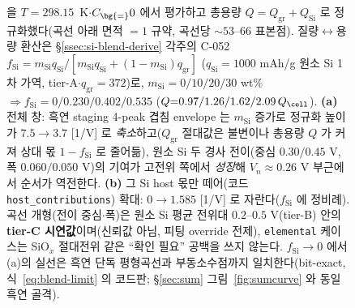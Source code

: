 \begin{figure}[t]
{을 $T{=}298.15$~K$\cdot$$C_\bg{=}0$ 에서 평가하고 총용량 $Q{=}Q_\mathrm{gr}{+}Q_\mathrm{Si}$ 로
정규화했다(곡선 아래 면적 $=1$ 규약, 곡선당 $\sim$$53$--$66$ 표본점). 질량$\leftrightarrow$용량 환산은
§\ref{ssec:si-blend-derive} 각주의 C-052
$f_\mathrm{Si}=m_\mathrm{Si}q_\mathrm{Si}/[m_\mathrm{Si}q_\mathrm{Si}+(1{-}m_\mathrm{Si})q_\mathrm{gr}]$
($q_\mathrm{Si}{=}1000$ mAh/g 원소 Si 1차 가역\cite{limthongkul2003}, tier-A$\cdot$$q_\mathrm{gr}{=}372$)로,
$m_\mathrm{Si}{=}0/10/20/30$ wt\% $\Rightarrow f_\mathrm{Si}{=}0/0.230/0.402/0.535$
($Q{=}0.97/1.26/1.62/2.09\,Q_\cell$). \textbf{(a)} 전체 창: 흑연 staging 4-peak 겹침 envelope 는
$m_\mathrm{Si}$ 증가로 정규화 높이가 $7.5\!\to\!3.7$ [1/V] 로 \emph{축소}하고($Q_\mathrm{gr}$ 절대값은
불변이나 총용량 $Q$ 가 커져 상대 몫 $1{-}f_\mathrm{Si}$ 로 줄어듦), 원소 Si 두 경사 전이(중심 $0.30/0.45$
V, 폭 $0.060/0.050$ V)의 기여가 고전위 쪽에서 \emph{성장}해 $V_n\!\approx\!0.26$ V 부근에서 순서가
역전한다. \textbf{(b)} 그 Si host 몫만 떼어(코드 \texttt{host\_contributions}) 확대: $0\!\to\!1.585$
[1/V] 로 자란다($f_\mathrm{Si}$ 에 정비례). 곡선 개형(전이 중심$\cdot$폭)은 원소 Si 평균 전위대
$0.2$--$0.5$ V\cite{obrovac_chevrier2014}(tier-B) 안의 \textbf{tier-C 시연값}이며(신뢰값 아님, 피팅
override 전제), \texttt{elemental} 케이스는 SiO$_x$ 절대전위 같은 ``확인 필요'' 공백을 쓰지 않는다.
$f_\mathrm{Si}\!\to\!0$ 에서 (a)의 실선은 흑연 단독 평형곡선과 부동소수점까지 일치한다(bit-exact,
식~\eqref{eq:blend-limit} 의 코드판; \S\ref{sec:sum} 그림~\ref{fig:sumcurve} 와 동일 흑연 골격).}
\label{fig:blend-family}
\end{figure}
